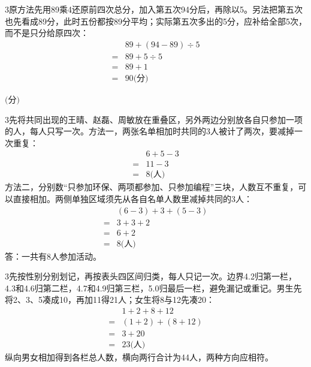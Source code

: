 \documentclass[multi=snippet,border={5bp 20bp 5bp 5bp}]{standalone}
\newenvironment{snippet}[3]{\begin{minipage}{#1bp}\color{answerred}\fontsize{#2}{#3}\selectfont\raggedright}{\end{minipage}}
\begin{document}
\begin{snippet}{505}{11.5}{14}\begin{multicols}{3}\raggedcolumns 原方法先用89乘4还原前四次总分，加入第五次94分后，再除以5。另法把第五次也先看成89分，此时五份都按89分平均；实际第五次多出的5分，应补给全部5次，而不是只分给原四次：\[\begin{aligned}&89+(94-89)\div5\\={}&89+5\div5\\={}&89+1\\={}&90\text{(分)}\end{aligned}\]\end{multicols}\end{snippet}
\begin{snippet}{80}{9.0}{14}\SourceSans\setlength{\mathindent}{2bp}\(\text{(分)}\)\end{snippet}
\begin{snippet}{505}{11.5}{14}\begin{multicols}{3}\raggedcolumns 先将共同出现的王晴、赵磊、周敏放在重叠区，另外两边分别放各自只参加一项的人，每人只写一次。方法一，两张名单相加时共同的3人被计了两次，要减掉一次重复：\[\begin{aligned}&6+5-3\\={}&11-3\\={}&8\text{(人)}\end{aligned}\]方法二，分别数“只参加环保、两项都参加、只参加编程”三块，人数互不重复，可以直接相加。两侧单独区域须先从各自名单人数里减掉共同的3人：\[\begin{aligned}&(6-3)+3+(5-3)\\={}&3+3+2\\={}&6+2\\={}&8\text{(人)}\end{aligned}\]答：一共有8人参加活动。\end{multicols}\end{snippet}
\begin{snippet}{505}{11.5}{14}\begin{multicols}{3}\raggedcolumns 先按性别分别划记，再按表头四区间归类，每人只记一次。边界4.2归第一栏，4.3和4.6归第二栏，4.7和4.9归第三栏，5.0归最后一栏，避免漏记或重记。男生先将2、3、5凑成10，再加11得21人；女生将8与12先凑20：\[\begin{aligned}&1+2+8+12\\={}&(1+2)+(8+12)\\={}&3+20\\={}&23\text{(人)}\end{aligned}\]纵向男女相加得到各栏总人数，横向两行合计为44人，两种方向应相符。\end{multicols}\end{snippet}
\end{document}
